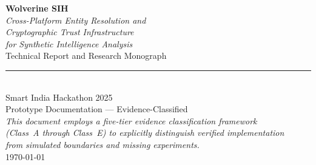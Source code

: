 \begin{titlepage}
\centering
\vspace*{3cm}

{\LARGE\bfseries Wolverine SIH}\\[0.5cm]
{\Large\itshape Cross-Platform Entity Resolution and\\Cryptographic Trust Infrastructure\\for Synthetic Intelligence Analysis}\\[2cm]

{\large Technical Report and Research Monograph}\\[1cm]

\rule{0.6\textwidth}{0.5pt}\\[1.5cm]

{\large Smart India Hackathon 2025}\\[0.5cm]
{\normalsize Prototype Documentation --- Evidence-Classified}\\[3cm]

{\small\itshape This document employs a five-tier evidence classification framework\\(Class~A through Class~E) to explicitly distinguish verified implementation\\from simulated boundaries and missing experiments.}\\[1cm]

\vfill
{\small\today}
\end{titlepage}

